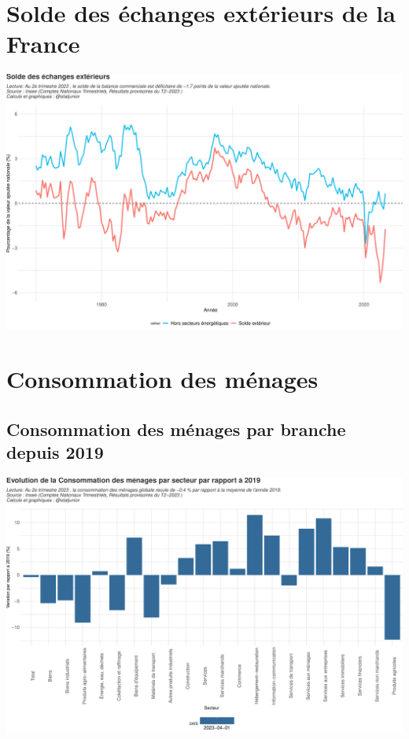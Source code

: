 \documentclass[
  paper=a4,
  ,captions=tableheading
]{scrartcl}
\begin{document}
\hypertarget{solde-des-uxe9changes-extuxe9rieurs-de-la-france}{%
\section{Solde des échanges extérieurs de la
France}\label{solde-des-uxe9changes-extuxe9rieurs-de-la-france}}

\includegraphics{rapport_pdf_compte_branche_files/figure-latex/unnamed-chunk-8-1.pdf}

\newpage

\hypertarget{consommation-des-muxe9nages}{%
\section{Consommation des ménages}\label{consommation-des-muxe9nages}}

\hypertarget{consommation-des-muxe9nages-par-branche-depuis-2019}{%
\subsection{Consommation des ménages par branche depuis
2019}\label{consommation-des-muxe9nages-par-branche-depuis-2019}}

\includegraphics{rapport_pdf_compte_branche_files/figure-latex/unnamed-chunk-10-1.pdf}
\end{document}
